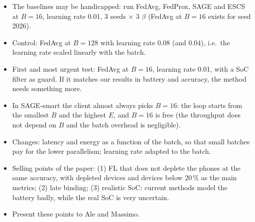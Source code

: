 \documentclass[11pt,a4paper]{article}
\begin{document}
\begin{itemize}
  \item The baselines may be handicapped: run FedAvg, FedProx, SAGE and ESCS
        at $B = 16$, learning rate 0.01, 3 seeds $\times$ 3 $\beta$ (FedAvg at
        $B = 16$ exists for seed 2026).
  \item Control: FedAvg at $B = 128$ with learning rate 0.08 (and 0.04), i.e.\
        the learning rate scaled linearly with the batch.
  \item First and most urgent test: FedAvg at $B = 16$, learning rate 0.01,
        with a SoC filter as guard. If it matches our results in battery and
        accuracy, the method needs something more.
  \item In SAGE-smart the client almost always picks $B = 16$: the loop starts
        from the smallest $B$ and the highest $E$, and $B = 16$ is free (the
        throughput does not depend on $B$ and the batch overhead is
        negligible).
  \item Changes: latency and energy as a function of the batch, so that small
        batches pay for the lower parallelism; learning rate adapted to the
        batch.
  \item Selling points of the paper: (1) FL that does not deplete the phones
        at the same accuracy, with depleted devices and devices below 20\,\%
        as the main metrics; (2) late binding; (3) realistic SoC: current
        methods model the battery badly, while the real SoC is very uncertain.
  \item Present these points to Ale and Massimo.
\end{itemize}
\end{document}
